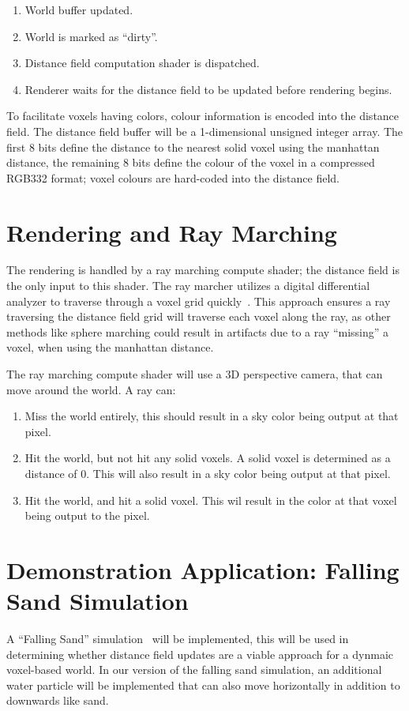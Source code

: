 \begin{enumerate}
    \item World buffer updated.
    \item World is marked as ``dirty''.
    \item Distance field computation shader is dispatched.
    \item Renderer waits for the distance field to be updated before rendering begins.
\end{enumerate}

To facilitate voxels having colors, colour information is encoded into the distance field. The distance field buffer
will be a 1-dimensional unsigned integer array. The first 8 bits define the distance to the nearest solid voxel using
the manhattan distance, the remaining 8 bits define the colour of the voxel in a compressed RGB332 format; voxel colours
are hard-coded into the distance field.

\section{Rendering and Ray Marching}\label{sec:ray_marching}
The rendering is handled by a ray marching compute shader; the distance field is the only input to this shader. The ray
marcher utilizes a digital differential analyzer to traverse through a voxel grid quickly~\cite{amanatides1987fast}.
This approach ensures a ray traversing the distance field grid will traverse each voxel along the ray, as other methods
like sphere marching could result in artifacts due to a ray ``missing'' a voxel, when using the manhattan distance.

The ray marching compute shader will use a 3D perspective camera, that can move around the world. A ray can:

\begin{enumerate}
    \item Miss the world entirely, this should result in a sky color being output at that pixel.
    \item Hit the world, but not hit any solid voxels. A solid voxel is determined as a distance of 0. This will also
    result in a sky color being output at that pixel.
    \item Hit the world, and hit a solid voxel. This wil result in the color at that voxel being output to the pixel.
\end{enumerate}

\section{Demonstration Application: Falling Sand Simulation}
A ``Falling Sand'' simulation~\cite{castroreal} will be implemented, this will be used in determining whether distance
field updates are a viable approach for a dynmaic voxel-based world. In our version of the falling sand simulation, an
additional water particle will be implemented that can also move horizontally in addition to downwards like sand.

